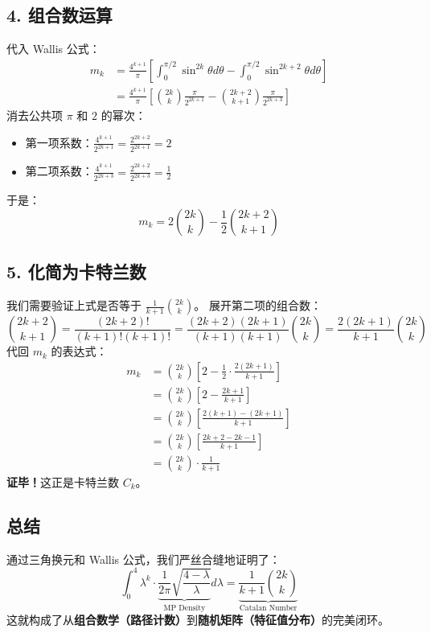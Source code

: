 \documentclass[11pt,a4paper]{ctexart}
\theoremstyle{definition}
\theoremstyle{remark}
\begin{document}
\subsection{4. 组合数运算}
代入 Wallis 公式：
\[
\begin{aligned}
m_k &= \frac{4^{k+1}}{\pi} \left[ \int_0^{\pi/2} \sin^{2k}\theta d\theta - \int_0^{\pi/2} \sin^{2k+2}\theta d\theta \right] \\
&= \frac{4^{k+1}}{\pi} \left[ \binom{2k}{k} \frac{\pi}{2^{2k+1}} - \binom{2k+2}{k+1} \frac{\pi}{2^{2k+3}} \right]
\end{aligned}
\]
消去公共项 $\pi$ 和 $2$ 的幂次：
\begin{itemize}
    \item 第一项系数：$\frac{4^{k+1}}{2^{2k+1}} = \frac{2^{2k+2}}{2^{2k+1}} = 2$
    \item 第二项系数：$\frac{4^{k+1}}{2^{2k+3}} = \frac{2^{2k+2}}{2^{2k+3}} = \frac{1}{2}$
\end{itemize}
于是：
\[
m_k = 2 \binom{2k}{k} - \frac{1}{2} \binom{2k+2}{k+1}
\]

\subsection{5. 化简为卡特兰数}
我们需要验证上式是否等于 $\frac{1}{k+1}\binom{2k}{k}$。
展开第二项的组合数：
\[
\binom{2k+2}{k+1} = \frac{(2k+2)!}{(k+1)!(k+1)!} = \frac{(2k+2)(2k+1)}{(k+1)(k+1)} \binom{2k}{k} = \frac{2(2k+1)}{k+1} \binom{2k}{k}
\]
代回 $m_k$ 的表达式：
\[
\begin{aligned}
m_k &= \binom{2k}{k} \left[ 2 - \frac{1}{2} \cdot \frac{2(2k+1)}{k+1} \right] \\
&= \binom{2k}{k} \left[ 2 - \frac{2k+1}{k+1} \right] \\
&= \binom{2k}{k} \left[ \frac{2(k+1) - (2k+1)}{k+1} \right] \\
&= \binom{2k}{k} \left[ \frac{2k+2 - 2k - 1}{k+1} \right] \\
&= \binom{2k}{k} \cdot \frac{1}{k+1}
\end{aligned}
\]
\textbf{证毕！}这正是卡特兰数 $C_k$。

\subsection{总结}
通过三角换元和 Wallis 公式，我们严丝合缝地证明了：
\[
\int_0^4 \lambda^k \cdot \underbrace{\frac{1}{2\pi}\sqrt{\frac{4-\lambda}{\lambda}}}_{\text{MP Density}} d\lambda = \underbrace{\frac{1}{k+1}\binom{2k}{k}}_{\text{Catalan Number}}
\]
这就构成了从\textbf{组合数学（路径计数）}到\textbf{随机矩阵（特征值分布）}的完美闭环。
\end{document}
